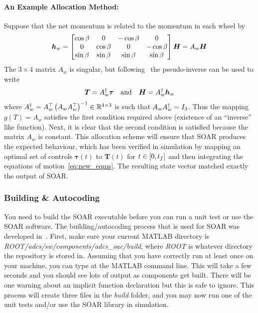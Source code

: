 \documentclass[10pt]{article}
\begin{document}
\paragraph{An Example Allocation Method:} Suppose that the net momentum is related to the momentum in each wheel by
\begin{equation}
\bm{h}_w = \begin{bmatrix}
\cos\beta & 0 & -\cos\beta & 0 \\ 0 & \cos\beta & 0 & -\cos\beta \\ \sin\beta & \sin\beta & \sin\beta & \sin\beta
\end{bmatrix} \bm{H} = A_w \bm{H}
\end{equation}
The $3\times 4$ matrix $A_w$ is singular, but following~\cite[\S 7.3.4]{Sidi1997} the pseudo-inverse can be used to write 
\begin{equation}
\bm{T} = A_w^{\dagger} \bm{\tau} \quad \text{and} \quad \bm{H} = A_w^{\dagger} \bm{h}_w
\end{equation}
where $A_w^{\dagger} = A_w^{\top} \left(A_w A_w^{\top}\right)^{-1} \in {\mathbb{R}}^{4\times 3}$
is such that $A_w A_w^{\dagger} = I_{3}$. Thus the mapping $g(T) = A_w$ satisfies the first condition required above (existence of an ``inverse'' like function). Next, it is clear that the second condition is satisfied because the matrix $A_w$ is constant. This allocation scheme will ensure that SOAR produces the expected behaviour, which has been verified in simulation by mapping an optimal set of controls $\bm{\tau}(t)$ to $\bm{T}(t)$ for $t\in[0,t_f]$ and then integrating the equations of motion~\eqref{eq:new_eqms}. The resulting state vector matched exactly the output of SOAR.

\subsubsection{Building \& Autocoding}\label{sec2:build_autocode}

You need to build the SOAR executable before you can run a unit test or use the SOAR software. The building/autocoding process that is used for SOAR was developed in~\cite{MalyutaThesis}. First, make sure your current MATLAB directory is \textit{ROOT/adcs/sw/components/adcs\_oac/build}, where \textit{ROOT} is whatever directory the repository is stored in. Assuming that you have correctly run  at least once on your machine, you can type  at the MATLAB command line. This will take a few seconds and you should see lots of output as components get built. There will be one warning about an implicit function declaration but this is safe to ignore. This process will create three files in the \textit{build} folder, and you may now run one of the unit tests and/or use the SOAR library in simulation.  
\end{document}
